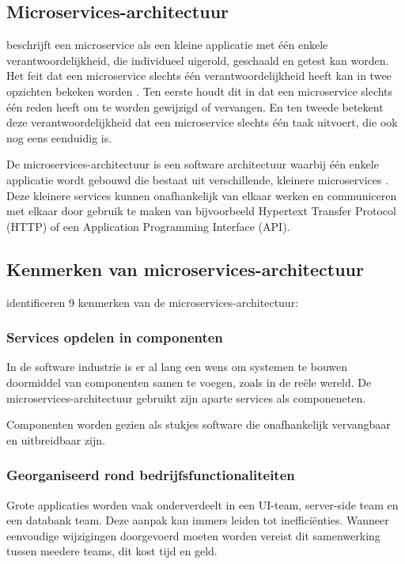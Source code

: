 \subsection{Microservices-architectuur}

\textcite{Thoenes2015} beschrijft een microservice als een kleine applicatie met één enkele verantwoordelijkheid, die individueel uigerold, geschaald en getest kan worden. Het feit dat een microservice slechts één verantwoordelijkheid heeft kan in twee opzichten bekeken worden \autocite{Thoenes2015}. Ten eerste houdt dit in dat een microservice slechts één reden heeft om te worden gewijzigd of vervangen. En ten tweede betekent deze verantwoordelijkheid dat een microservice slechts één taak uitvoert, die ook nog eens eenduidig is.

De microservices-architectuur is een software architectuur waarbij één enkele applicatie wordt gebouwd die bestaat uit verschillende, kleinere microservices \autocite{Lewis2014}. Deze kleinere services kunnen onafhankelijk van elkaar werken en communiceren met elkaar door gebruik te maken van bijvoorbeeld Hypertext Transfer Protocol (HTTP) of een Application Programming Interface (API). 

\subsection{Kenmerken van microservices-\-architectuur}

\textcite{Lewis2014} identificeren 9 kenmerken van de microservices-architectuur:

\subsubsection{Services opdelen in componenten}

In de software industrie is er al lang een wens om systemen te bouwen doormiddel van componenten samen te voegen, zoals in de reële wereld. De microservices-architectuur gebruikt zijn aparte services als componeneten.

Componenten worden gezien als stukjes software die onafhankelijk vervangbaar en uitbreidbaar zijn.

\subsubsection{Georganiseerd rond bedrijfsfunctionaliteiten}

Grote applicaties worden vaak onderverdeelt in een UI-team, server-side team en een databank team. Deze aanpak kan immers leiden tot inefficiënties. Wanneer eenvoudige wijzigingen doorgevoerd moeten worden vereist dit samenwerking tussen meedere teams, dit kost tijd en geld.

